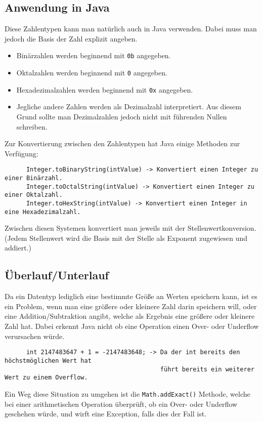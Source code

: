 \documentclass{article}
\begin{document}
	  \subsection{Anwendung in Java}
	  Diese Zahlentypen kann man natürlich auch in Java verwenden. Dabei muss man jedoch die Basis der Zahl explizit angeben.
	  \begin{itemize}
	  	\item{Binärzahlen werden beginnend mit \verb|0b| angegeben.}
	  	\item{Oktalzahlen werden beginnend mit \verb|0| angegeben.}
	  	\item{Hexadezimalzahlen werden beginnend mit \verb|0x| angegeben.}
	  	\item{Jegliche andere Zahlen werden als Dezimalzahl interpretiert. Aus diesem Grund sollte man Dezimalzahlen jedoch nicht mit führenden Nullen schreiben.}
	  \end{itemize}
	  Zur Konvertierung zwischen den Zahlentypen hat Java einige Methoden zur Verfügung:
	  \begin{verbatim}
	  Integer.toBinaryString(intValue) -> Konvertiert einen Integer zu einer Binärzahl.
	  Integer.toOctalString(intValue) -> Konvertiert einen Integer zu einer Oktalzahl.
	  Integer.toHexString(intValue) -> Konvertiert einen Integer in eine Hexadezimalzahl.
	  \end{verbatim}
	  Zwischen diesen Systemen konvertiert man jeweils mit der Stellenwertkonversion. (Jedem Stellenwert wird die Basis mit der Stelle als Exponent zugewiesen und addiert.)
	  \subsection{Überlauf/Unterlauf}
	  Da ein Datentyp lediglich eine bestimmte Größe an Werten speichern kann, ist es ein Problem, wenn man eine größere oder kleinere Zahl darin speichern will, oder eine Addition/Subtraktion angibt, welche als Ergebnis eine größere oder kleinere Zahl hat. Dabei erkennt Java nicht ob eine Operation einen Over- oder Underflow verursachen würde.
	  \begin{verbatim}
	  int 2147483647 + 1 = -2147483648; -> Da der int bereits den höchstmöglichen Wert hat
	                                       führt bereits ein weiterer Wert zu einem Overflow.
	  \end{verbatim}
	  Ein Weg diese Situation zu umgehen ist die \verb|Math.addExact()| Methode, welche bei einer arithmetischen Operation überprüft, ob ein Over- oder Underflow geschehen würde, und wirft eine Exception, falls dies der Fall ist.
\end{document}
